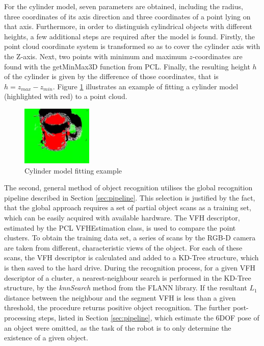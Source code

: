 For the cylinder model, seven parameters are obtained, including the radius, three coordinates of its axis direction and three coordinates of a point lying on that axis. Furthermore, in order to distinguish cylindrical objects with different heights, a few additional steps are required after the model is found. Firstly, the point cloud coordinate system is transformed so as to cover the cylinder axis with the Z-axis. Next, two points with minimum and maximum $z$-coordinates are found with the getMinMax3D function from PCL. Finally, the resulting height $h$ of the cylinder is given by the difference of those coordinates, that is $h = z_{max} - z_{min}$. Figure \ref{fig:cylinder} illustrates an example of fitting a cylinder model (highlighted with red) to a point cloud.

\begin{figure}[H]
\centering
\includegraphics[width=0.3\textwidth]{fig/cylinder}
\caption{Cylinder model fitting example \cite{pcl}}
\label{fig:cylinder}
\end{figure}

The second, general method of object recognition utilises the global recognition pipeline described in Section \ref{sec:pipeline}. This selection is justified by the fact, that the global approach requires a set of partial object scans as a training set, which can be easily acquired with available hardware. The VFH descriptor, estimated by the PCL VFHEstimation class, is used to compare the point clusters. To obtain the training data set, a series of scans by the RGB-D camera are taken from different, characteristic views of the object. For each of these scans, the VFH descriptor is calculated and added to a KD-Tree structure, which is then saved to the hard drive. During the recognition process, for a given VFH descriptor of a cluster, a nearest-neighbour search is performed in the KD-Tree structure, by the \textit{knnSearch} method from the FLANN library. If the resultant $L_1$ distance between the neighbour and the segment VFH is less than a given threshold, the procedure returns positive object recognition. The further post-processing steps, listed in Section \ref{sec:pipeline}, which estimate the 6DOF pose of an object were omitted, as the task of the robot is to only determine the existence of a given object.

